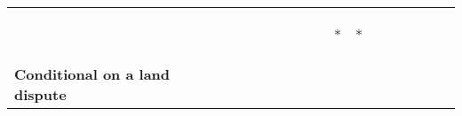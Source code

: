 \begin{tabular}{lcccccccccccccccccc}
 & \begin{footnotesize}[0.008]\end{footnotesize} & \begin{footnotesize}[0.010]\end{footnotesize} & \begin{footnotesize}[0.006]\end{footnotesize} & \begin{footnotesize}[0.006]\end{footnotesize} & \begin{footnotesize}[0.009]\end{footnotesize} & \begin{footnotesize}[0.007]\end{footnotesize} & \begin{footnotesize}[0.005]\end{footnotesize} & \begin{footnotesize}[0.008]\end{footnotesize} & \begin{footnotesize}[0.009]\end{footnotesize} & \begin{footnotesize}[0.005]\end{footnotesize} & \begin{footnotesize}[0.013]*\end{footnotesize} & \begin{footnotesize}[0.012]*\end{footnotesize} & \begin{footnotesize}[0.007]\end{footnotesize} & \begin{footnotesize}[0.024]\end{footnotesize} & \begin{footnotesize}[0.019]\end{footnotesize} & \begin{footnotesize}[0.009]\end{footnotesize} & \begin{footnotesize}[0.021]\end{footnotesize} & \begin{footnotesize}[0.014]\end{footnotesize}\\
\noalign{\smallskip}\textbf{Conditional on a land dispute} &  &  &  &  &  &  &  &  &  &  &  &  &  &  &  &  &  & \\

\end{tabular}
